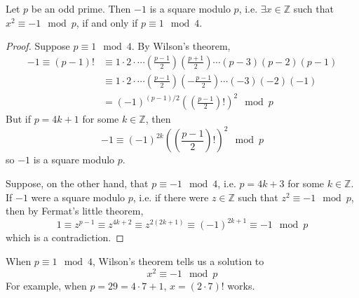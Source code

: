 \documentclass[10pt, a4paper, twoside]{report}
\begin{document}
\begin{proposition}
    Let \(p\) be an odd prime. Then \(-1\) is a square modulo \(p\), i.e. \(\exists x\in\mathbb{Z}\) such that \(x^2\equiv -1\mod p\), if and only if \(p\equiv 1\mod 4\).
\end{proposition}
\begin{proof}
    Suppose \(p\equiv 1\mod 4\). By Wilson's theorem, 
    \begin{align*}
        -1\equiv (p-1)! &\equiv 1\cdot 2\cdot\cdots\left(\frac{p-1}{2}\right)\left(\frac{p+1}{2}\right)\cdots(p-3)(p-2)(p-1) \\
        &\equiv 1\cdot 2\cdot\cdots\left(\frac{p-1}{2}\right)\left(-\frac{p-1}{2}\right)\cdots(-3)(-2)(-1) \\
        &=(-1)^{(p-1)/2}\left(\left(\frac{p-1}2\right)!\right)^2\mod p 
    \end{align*}
    But if \(p=4k+1\) for some \(k\in\mathbb{Z}\), then 
    \[-1\equiv(-1)^{2k}\left(\left(\frac{p-1}2\right)!\right)^2\mod p\]
    so \(-1\) is a square modulo \(p\).

    Suppose, on the other hand, that \(p\equiv -1\mod 4\), i.e. \(p=4k+3\) for some \(k\in\mathbb{Z}\). If \(-1\) were a square modulo \(p\), i.e. if there were \(z\in\mathbb{Z}\) such that \(z^2\equiv -1\mod p\), then by Fermat's little theorem, 
    \[1\equiv z^{p-1}\equiv z^{4k+2}\equiv z^{2(2k+1)}\equiv (-1)^{2k+1}\equiv -1\mod p\]
    which is a contradiction.
\end{proof}
\begin{remark}
    When \(p\equiv 1\mod 4\), Wilson's theorem tells us a solution to \[x^2\equiv -1\mod p\]
    For example, when \(p=29=4\cdot 7+1\), \(x=(2\cdot 7)!\) works.
\end{remark}
\end{document}
